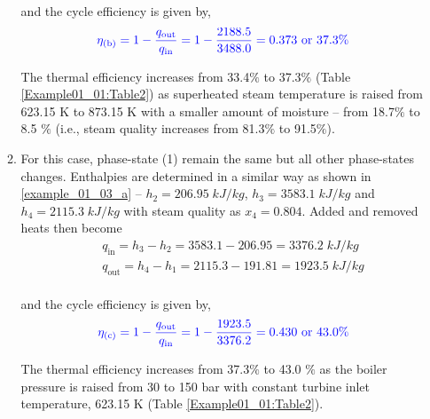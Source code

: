 \documentclass[12pts,a4paper,amsmath,amssymb,floatfix]{article}%
\newcommand{\frc}{\displaystyle\frac}
\begin{document}
\begin{enumerate}[label=\bfseries Example \arabic*]
\begin{enumerate}
and the cycle efficiency is given by,
\begin{displaymath}
\textcolor{blue}{\eta_{\text{(b)}}=1-\frc{q_{\text{out}}}{q_{\text{in}}} = 1 - \frc{2188.5}{3488.0} = 0.373 \text{ or } 37.3\%}
\end{displaymath}

The thermal efficiency increases from 33.4$\%$ to 37.3$\%$ (Table \ref{Example01_01:Table2}) as superheated steam temperature is raised from 623.15 K to 873.15 K with a smaller amount of moisture -- from 18.7$\%$ to 8.5 $\%$ (i.e., steam quality increases from 81.3$\%$ to 91.5$\%$).

\item \label{example_01_03_c} For this case, phase-state (1) remain the same but all other phase-states changes. Enthalpies are determined in a similar way as shown in \ref{example_01_03_a} --  $h_{2}=206.95\;kJ/kg$, $h_{3}=3583.1\;kJ/kg$ and $h_{4}=2115.3\;kJ/kg$ with steam quality as $x_{4}=0.804$.  Added and removed heats then become
\begin{eqnarray}
&& q_{\text{in}}=h_{3}-h_{2}=3583.1-206.95=3376.2\;kJ/kg \nonumber \\
&& q_{\text{out}}=h_{4}-h_{1}=2115.3-191.81=1923.5\;kJ/kg \nonumber \\
\end{eqnarray}

and the cycle efficiency is given by,
\begin{displaymath}
\textcolor{blue}{\eta_{\text{(c)}}=1-\frc{q_{\text{out}}}{q_{\text{in}}} = 1 - \frc{1923.5}{3376.2} = 0.430 \text{ or } 43.0\%}
\end{displaymath}

\medskip


The thermal efficiency increases from 37.3$\%$ to 43.0 $\%$ as the boiler pressure is raised from 30 to 150 bar with constant turbine inlet temperature, 623.15 K (Table \ref{Example01_01:Table2}).


\end{enumerate}
\end{enumerate}
\end{document}
